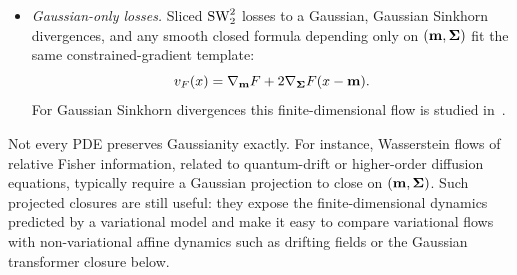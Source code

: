 \begin{example}
\begin{itemize}
		\item \emph{Gaussian-only losses.} Sliced $\operatorname{SW}_2^2$ losses to a Gaussian, Gaussian Sinkhorn divergences, and any smooth closed formula depending only on $(\mathbf{m},\mathbf{\Sigma})$ fit the same constrained-gradient template:
			\[
				v_F(x)=\nabla_{\mathbf{m}} F+2\nabla_{\mathbf{\Sigma}} F(x-\mathbf{m}).
			\]
		For Gaussian Sinkhorn divergences this finite-dimensional flow is studied in~\cite{HardionLacombe2026GaussianSinkhornFlow}.
	\end{itemize}

	Not every PDE preserves Gaussianity exactly. For instance, Wasserstein flows of relative Fisher information, related to quantum-drift or higher-order diffusion equations, typically require a Gaussian projection to close on $(\mathbf{m},\mathbf{\Sigma})$. Such projected closures are still useful: they expose the finite-dimensional dynamics predicted by a variational model and make it easy to compare variational flows with non-variational affine dynamics such as drifting fields or the Gaussian transformer closure below.
\end{example}

